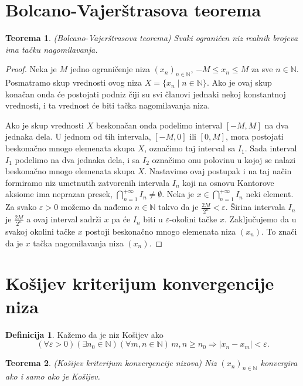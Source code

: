 \documentclass[a4paper,12pt]{article}
\theoremstyle{plain}
\newtheorem{theorem}{Teorema}[section]
\theoremstyle{definition}
\newtheorem{definition}{Definicija}[section]
\theoremstyle{remark}
\begin{document}
\section{Bolcano-Vajerštrasova teorema}
\begin{theorem}
(Bolcano-Vajerštrasova teorema) Svaki ograničen niz realnih brojeva ima tačku nagomilavanja.
\end{theorem}

\begin{proof}
Neka je $M$ jedno ograničenje niza $(x_n)_{n \in \mathbb{N}}$, $-M \leq x_n \leq M$ za sve $n \in \mathbb{N}$. Posmatramo skup vrednosti ovog niza $X = \{x_n \mid n \in \mathbb{N}\}$. Ako je ovaj skup konačan onda će postojati podniz čiji su svi članovi jednaki nekoj konstantnoj vrednosti, i ta vrednost će biti tačka nagomilavanja niza.

Ako je skup vrednosti $X$ beskonačan onda podelimo interval $[-M, M]$ na dva jednaka dela. U jednom od tih intervala, $[-M, 0]$ ili $[0, M]$, mora postojati beskonačno mnogo elemenata skupa $X$, označimo taj interval sa $I_1$. Sada interval $I_1$ podelimo na dva jednaka dela, i sa $I_2$ označimo onu polovinu u kojoj se nalazi beskonačno mnogo elemenata skupa $X$. Nastavimo ovaj postupak i na taj način formiramo niz umetnutih zatvorenih intervala $I_n$ koji na osnovu Kantorove aksiome ima neprazan presek, $\bigcap_{n=1}^{+\infty} I_n \neq \emptyset$. Neka je $x \in \bigcap_{n=1}^{+\infty} I_n$ neki element. Za svako $\varepsilon > 0$ možemo da nađemo $n \in \mathbb{N}$ takvo da je $\frac{2M}{2^n} < \varepsilon$. Širina intervala $I_n$ je $\frac{2M}{2^n}$ a ovaj interval sadrži $x$ pa će $I_n$ biti u $\varepsilon$-okolini tačke $x$. Zaključujemo da u svakoj okolini tačke $x$ postoji beskonačno mnogo elemenata niza $(x_n)$. To znači da je $x$ tačka nagomilavanja niza $(x_n)$.
\end{proof}

\section{Košijev kriterijum konvergencije niza}
\begin{definition}
Kažemo da je niz Košijev ako
$$ (\forall \varepsilon > 0)(\exists n_0 \in \mathbb{N})(\forall m, n \in \mathbb{N}) \, m, n \geq n_0 \Rightarrow |x_n - x_m| < \varepsilon. $$
\end{definition}
\begin{theorem}
(Košijev kriterijum konvergencije nizova) Niz $(x_n)_{n \in \mathbb{N}}$ konvergira ako i samo ako je Košijev.
\end{theorem}
\end{document}
